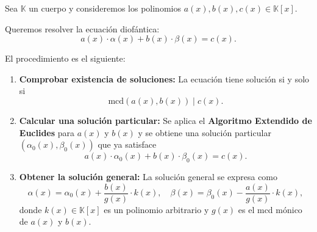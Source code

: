 \documentclass[a4paper,12pt]{article}
\begin{document}
\begin{procedimiento}[title=Resolución de ecuaciones diofánticas en \(\mathbb{K}\)]
Sea \(\mathbb{K}\) un cuerpo y consideremos los polinomios \(a(x), b(x), c(x) \in \mathbb{K}[x]\).

Queremos resolver la ecuación diofántica:
\[
a(x) \cdot \alpha(x) + b(x) \cdot \beta(x) = c(x).
\]

El procedimiento es el siguiente:

\begin{enumerate}
  \item \textbf{Comprobar existencia de soluciones:}  
  La ecuación tiene solución si y solo si 
  \[
  \text{mcd}(a(x),b(x)) \mid c(x).
  \]

  \item \textbf{Calcular una solución particular:}  
  Se aplica el \textbf{Algoritmo Extendido de Euclides} para \(a(x)\) y \(b(x)\) y se obtiene una solución particular
  \((\alpha_0(x), \beta_0(x))\) que ya satisface
  \[
  a(x)\cdot\alpha_0(x) + b(x)\cdot\beta_0(x) = c(x).
  \]

  \item \textbf{Obtener la solución general:}  
  La solución general se expresa como
  \[
  \alpha(x) = \alpha_0(x) + \frac{b(x)}{g(x)} \cdot k(x), \quad
  \beta(x) = \beta_0(x) - \frac{a(x)}{g(x)} \cdot k(x),
  \]
  donde \(k(x) \in \mathbb{K}[x]\) es un polinomio arbitrario y \(g(x)\) es el mcd mónico de \(a(x)\) y \(b(x)\).
\end{enumerate}
\end{procedimiento}
\end{document}
